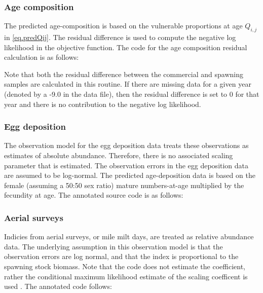 \documentclass[12pt,letterpaper]{article}
\begin{document}
    \subsubsection{Age composition} %
    \label{ssub:age_composition}
    The predicted age-composition is based on the vulnerable proportions at age $Q_{i,j}$ in \eqref{eq.predQij}.  The residual difference is used to compute the negative log likelihood in the objective function.  The code for the age composition residual calculation is as follows:
    
    Note that both the residual difference between the commercial and spawning samples are calculated in this routine.  If there are missing data for a given year (denoted by a -9.0 in the data file), then the residual difference is set to 0 for that year and there is no contribution to the negative log likelihood.

    \subsubsection{Egg deposition} %
    \label{ssub:egg_deposition}
    The observation model for the egg deposition data treats these observations as estimates of absolute abundance.  Therefore, there is no associated scaling parameter that is estimated. The observation errors in the egg deposition data are assumed to be log-normal.  The predicted age-deposition data is based on the female (assuming a 50:50 sex ratio) mature numbers-at-age multiplied by the fecundity at age.  The annotated source code is as follows:
    


    \subsubsection{Aerial surveys} %
    \label{ssub:aerial_surveys}
    Indicies from aerial surveys, or mile milt days, are treated as relative abundance data.  The underlying assumption in this observation model is that the observation errors are log normal, and that the index is proportional to the spawning stock biomass.  Note that the code does not estimate the coefficient, rather the conditional maximum likelihood estimate of the scaling coefficent is used \citep[see][for a full explanation]{walters1994calculation}.  The annotated code follows:
     
\end{document}

